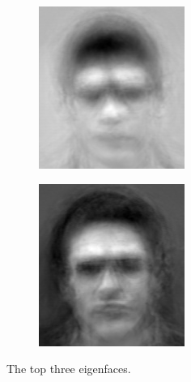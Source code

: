 \begin{figure}
\begin{subfigure}[b]{0.3\textwidth}
\includegraphics[width=\textwidth]{eigenface1.png}
\end{subfigure}
\begin{subfigure}[b]{0.3\textwidth}
\includegraphics[width=\textwidth]{eigenface2.png}
\end{subfigure}
\caption{The top three eigenfaces.}
\label{facialRecognition:eigenfaces}
\end{figure}

